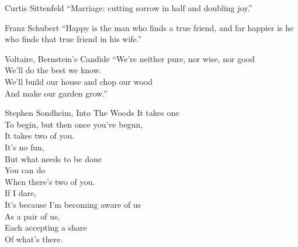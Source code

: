 \begin{aquote}{Curtis Sittenfeld}
    ``Marriage: cutting sorrow in half and doubling joy.''
\end{aquote}
\begin{aquote}{Franz Schubert}
    ``Happy is the man who finds a true friend, and far happier is he who finds that true friend in his wife.''
\end{aquote}
\begin{aquote}{Voltaire, Bernstein's Candide}
    ``We're neither pure, nor wise, nor good\\
    We'll do the best we know.\\
    We'll build our house and chop our wood\\
    And make our garden grow.''
\end{aquote}
\begin{aquote}{Stephen Sondheim, Into The Woods}
    It takes one\\
    To begin, but then once you've begun,\\
    It takes two of you.\\
    It's no fun,\\
    But what needs to be done\\
    You can do\\
    When there's two of you.\\
    If I dare,\\
    It's because I'm becoming aware of us\\
    As a pair of us,\\
    Each accepting a share\\
    Of what's there.
\end{aquote}
